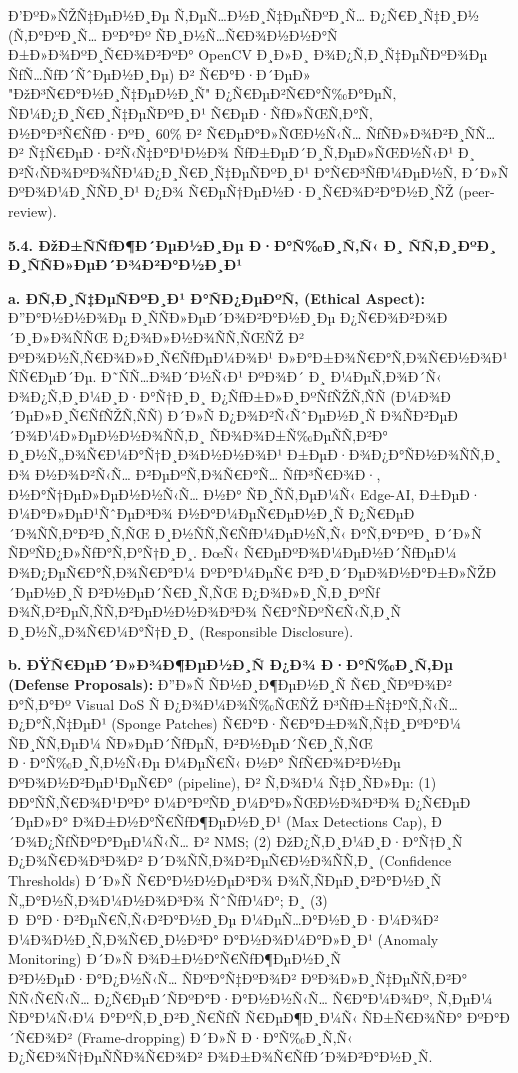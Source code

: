 \documentclass[]{article}
\begin{document}
\begin{enumerate}
\end{enumerate}

Ð’ÐºÐ»ÑŽÑ‡ÐµÐ½Ð¸Ðµ Ñ‚ÐµÑ…Ð½Ð¸Ñ‡ÐµÑÐºÐ¸Ñ… Ð¿Ñ€Ð¸Ñ‡Ð¸Ð½ (Ñ‚Ð°ÐºÐ¸Ñ… ÐºÐ°Ðº ÑÐ¸Ð½Ñ…Ñ€Ð¾Ð½Ð½Ð°Ñ Ð±Ð»Ð¾ÐºÐ¸Ñ€Ð¾Ð²ÐºÐ° OpenCV Ð¸Ð»Ð¸ Ð¾Ð¿Ñ‚Ð¸Ñ‡ÐµÑÐºÐ¾Ðµ ÑƒÑ…ÑƒÐ´ÑˆÐµÐ½Ð¸Ðµ) Ð² Ñ€Ð°Ð·Ð´ÐµÐ» "ÐžÐ³Ñ€Ð°Ð½Ð¸Ñ‡ÐµÐ½Ð¸Ñ" Ð¿Ñ€ÐµÐ²Ñ€Ð°Ñ‰Ð°ÐµÑ‚ ÑÐ¼Ð¿Ð¸Ñ€Ð¸Ñ‡ÐµÑÐºÐ¸Ð¹ Ñ€ÐµÐ·ÑƒÐ»ÑŒÑ‚Ð°Ñ‚ Ð½Ð°Ð³Ñ€ÑƒÐ·ÐºÐ¸ 60\% Ð² Ñ€ÐµÐ°Ð»ÑŒÐ½Ñ‹Ñ… ÑƒÑÐ»Ð¾Ð²Ð¸ÑÑ… Ð² Ñ‡Ñ€ÐµÐ·Ð²Ñ‹Ñ‡Ð°Ð¹Ð½Ð¾ ÑƒÐ±ÐµÐ´Ð¸Ñ‚ÐµÐ»ÑŒÐ½Ñ‹Ð¹ Ð¸ Ð²Ñ‹ÑÐ¾ÐºÐ¾ÑÐ¼Ð¿Ð¸Ñ€Ð¸Ñ‡ÐµÑÐºÐ¸Ð¹ Ð°Ñ€Ð³ÑƒÐ¼ÐµÐ½Ñ‚ Ð´Ð»Ñ ÐºÐ¾Ð¼Ð¸ÑÑÐ¸Ð¹ Ð¿Ð¾ Ñ€ÐµÑ†ÐµÐ½Ð·Ð¸Ñ€Ð¾Ð²Ð°Ð½Ð¸ÑŽ (peer-review).

\textbf{5.4. ÐžÐ±ÑÑƒÐ¶Ð´ÐµÐ½Ð¸Ðµ Ð·Ð°Ñ‰Ð¸Ñ‚Ñ‹ Ð¸ ÑÑ‚Ð¸ÐºÐ¸ Ð¸ÑÑÐ»ÐµÐ´Ð¾Ð²Ð°Ð½Ð¸Ð¹}

\textbf{a. Ð­Ñ‚Ð¸Ñ‡ÐµÑÐºÐ¸Ð¹ Ð°ÑÐ¿ÐµÐºÑ‚ (Ethical Aspect):} Ð”Ð°Ð½Ð½Ð¾Ðµ Ð¸ÑÑÐ»ÐµÐ´Ð¾Ð²Ð°Ð½Ð¸Ðµ Ð¿Ñ€Ð¾Ð²Ð¾Ð´Ð¸Ð»Ð¾ÑÑŒ Ð¿Ð¾Ð»Ð½Ð¾ÑÑ‚ÑŒÑŽ Ð² ÐºÐ¾Ð½Ñ‚Ñ€Ð¾Ð»Ð¸Ñ€ÑƒÐµÐ¼Ð¾Ð¹ Ð»Ð°Ð±Ð¾Ñ€Ð°Ñ‚Ð¾Ñ€Ð½Ð¾Ð¹ ÑÑ€ÐµÐ´Ðµ. Ð˜ÑÑ…Ð¾Ð´Ð½Ñ‹Ð¹ ÐºÐ¾Ð´ Ð¸ Ð¼ÐµÑ‚Ð¾Ð´Ñ‹ Ð¾Ð¿Ñ‚Ð¸Ð¼Ð¸Ð·Ð°Ñ†Ð¸Ð¸ Ð¿ÑƒÐ±Ð»Ð¸ÐºÑƒÑŽÑ‚ÑÑ (Ð¼Ð¾Ð´ÐµÐ»Ð¸Ñ€ÑƒÑŽÑ‚ÑÑ) Ð´Ð»Ñ Ð¿Ð¾Ð²Ñ‹ÑˆÐµÐ½Ð¸Ñ Ð¾ÑÐ²ÐµÐ´Ð¾Ð¼Ð»ÐµÐ½Ð½Ð¾ÑÑ‚Ð¸ ÑÐ¾Ð¾Ð±Ñ‰ÐµÑÑ‚Ð²Ð° Ð¸Ð½Ñ„Ð¾Ñ€Ð¼Ð°Ñ†Ð¸Ð¾Ð½Ð½Ð¾Ð¹ Ð±ÐµÐ·Ð¾Ð¿Ð°ÑÐ½Ð¾ÑÑ‚Ð¸ Ð¾ Ð½Ð¾Ð²Ñ‹Ñ… Ð²ÐµÐºÑ‚Ð¾Ñ€Ð°Ñ… ÑƒÐ³Ñ€Ð¾Ð·, Ð½Ð°Ñ†ÐµÐ»ÐµÐ½Ð½Ñ‹Ñ… Ð½Ð° ÑÐ¸ÑÑ‚ÐµÐ¼Ñ‹ Edge-AI, Ð±ÐµÐ· Ð¼Ð°Ð»ÐµÐ¹ÑˆÐµÐ³Ð¾ Ð½Ð°Ð¼ÐµÑ€ÐµÐ½Ð¸Ñ Ð¿Ñ€ÐµÐ´Ð¾ÑÑ‚Ð°Ð²Ð¸Ñ‚ÑŒ Ð¸Ð½ÑÑ‚Ñ€ÑƒÐ¼ÐµÐ½Ñ‚Ñ‹ Ð°Ñ‚Ð°ÐºÐ¸ Ð´Ð»Ñ ÑÐºÑÐ¿Ð»ÑƒÐ°Ñ‚Ð°Ñ†Ð¸Ð¸. ÐœÑ‹ Ñ€ÐµÐºÐ¾Ð¼ÐµÐ½Ð´ÑƒÐµÐ¼ Ð¾Ð¿ÐµÑ€Ð°Ñ‚Ð¾Ñ€Ð°Ð¼ ÐºÐ°Ð¼ÐµÑ€ Ð²Ð¸Ð´ÐµÐ¾Ð½Ð°Ð±Ð»ÑŽÐ´ÐµÐ½Ð¸Ñ Ð²Ð½ÐµÐ´Ñ€Ð¸Ñ‚ÑŒ Ð¿Ð¾Ð»Ð¸Ñ‚Ð¸ÐºÑƒ Ð¾Ñ‚Ð²ÐµÑ‚ÑÑ‚Ð²ÐµÐ½Ð½Ð¾Ð³Ð¾ Ñ€Ð°ÑÐºÑ€Ñ‹Ñ‚Ð¸Ñ Ð¸Ð½Ñ„Ð¾Ñ€Ð¼Ð°Ñ†Ð¸Ð¸ (Responsible Disclosure).

\textbf{b. ÐŸÑ€ÐµÐ´Ð»Ð¾Ð¶ÐµÐ½Ð¸Ñ Ð¿Ð¾ Ð·Ð°Ñ‰Ð¸Ñ‚Ðµ (Defense Proposals):} Ð”Ð»Ñ ÑÐ½Ð¸Ð¶ÐµÐ½Ð¸Ñ Ñ€Ð¸ÑÐºÐ¾Ð² Ð°Ñ‚Ð°Ðº Visual DoS Ñ Ð¿Ð¾Ð¼Ð¾Ñ‰ÑŒÑŽ Ð³ÑƒÐ±Ñ‡Ð°Ñ‚Ñ‹Ñ… Ð¿Ð°Ñ‚Ñ‡ÐµÐ¹ (Sponge Patches) Ñ€Ð°Ð·Ñ€Ð°Ð±Ð¾Ñ‚Ñ‡Ð¸ÐºÐ°Ð¼ ÑÐ¸ÑÑ‚ÐµÐ¼ ÑÐ»ÐµÐ´ÑƒÐµÑ‚ Ð²Ð½ÐµÐ´Ñ€Ð¸Ñ‚ÑŒ Ð·Ð°Ñ‰Ð¸Ñ‚Ð½Ñ‹Ðµ Ð¼ÐµÑ€Ñ‹ Ð½Ð° ÑƒÑ€Ð¾Ð²Ð½Ðµ ÐºÐ¾Ð½Ð²ÐµÐ¹ÐµÑ€Ð° (pipeline), Ð² Ñ‚Ð¾Ð¼ Ñ‡Ð¸ÑÐ»Ðµ: (1) ÐÐ°ÑÑ‚Ñ€Ð¾Ð¹ÐºÐ° Ð¼Ð°ÐºÑÐ¸Ð¼Ð°Ð»ÑŒÐ½Ð¾Ð³Ð¾ Ð¿Ñ€ÐµÐ´ÐµÐ»Ð° Ð¾Ð±Ð½Ð°Ñ€ÑƒÐ¶ÐµÐ½Ð¸Ð¹ (Max Detections Cap), Ð´Ð¾Ð¿ÑƒÑÐºÐ°ÐµÐ¼Ñ‹Ñ… Ð² NMS; (2) ÐžÐ¿Ñ‚Ð¸Ð¼Ð¸Ð·Ð°Ñ†Ð¸Ñ Ð¿Ð¾Ñ€Ð¾Ð³Ð¾Ð² Ð´Ð¾ÑÑ‚Ð¾Ð²ÐµÑ€Ð½Ð¾ÑÑ‚Ð¸ (Confidence Thresholds) Ð´Ð»Ñ Ñ€Ð°Ð½Ð½ÐµÐ³Ð¾ Ð¾Ñ‚ÑÐµÐ¸Ð²Ð°Ð½Ð¸Ñ Ñ„Ð°Ð½Ñ‚Ð¾Ð¼Ð½Ð¾Ð³Ð¾ ÑˆÑƒÐ¼Ð°; Ð¸ (3) Ð Ð°Ð·Ð²ÐµÑ€Ñ‚Ñ‹Ð²Ð°Ð½Ð¸Ðµ Ð¼ÐµÑ…Ð°Ð½Ð¸Ð·Ð¼Ð¾Ð² Ð¼Ð¾Ð½Ð¸Ñ‚Ð¾Ñ€Ð¸Ð½Ð³Ð° Ð°Ð½Ð¾Ð¼Ð°Ð»Ð¸Ð¹ (Anomaly Monitoring) Ð´Ð»Ñ Ð¾Ð±Ð½Ð°Ñ€ÑƒÐ¶ÐµÐ½Ð¸Ñ Ð²Ð½ÐµÐ·Ð°Ð¿Ð½Ñ‹Ñ… ÑÐºÐ°Ñ‡ÐºÐ¾Ð² ÐºÐ¾Ð»Ð¸Ñ‡ÐµÑÑ‚Ð²Ð° ÑÑ‹Ñ€Ñ‹Ñ… Ð¿Ñ€ÐµÐ´ÑÐºÐ°Ð·Ð°Ð½Ð½Ñ‹Ñ… Ñ€Ð°Ð¼Ð¾Ðº, Ñ‚ÐµÐ¼ ÑÐ°Ð¼Ñ‹Ð¼ Ð°ÐºÑ‚Ð¸Ð²Ð¸Ñ€ÑƒÑ Ñ€ÐµÐ¶Ð¸Ð¼Ñ‹ ÑÐ±Ñ€Ð¾ÑÐ° ÐºÐ°Ð´Ñ€Ð¾Ð² (Frame-dropping) Ð´Ð»Ñ Ð·Ð°Ñ‰Ð¸Ñ‚Ñ‹ Ð¿Ñ€Ð¾Ñ†ÐµÑÑÐ¾Ñ€Ð¾Ð² Ð¾Ð±Ð¾Ñ€ÑƒÐ´Ð¾Ð²Ð°Ð½Ð¸Ñ.
\end{document}
